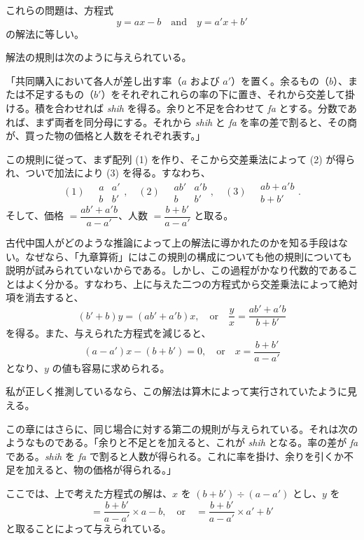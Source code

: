 \documentclass[11pt]{article}
\newcommand{\scanpage}[2]{\clearpage\setcounter{footnote}{0}\noindent{\footnotesize\color{gray}PDF #1 頁 · #2}\par\medskip}
\newcommand{\scanfooter}{}
\begin{document}
これらの問題は、方程式
\[
y=ax-b\quad \text{and}\quad y=a'x+b'
\]
の解法に等しい。

解法の規則は次のように与えられている。

「共同購入において各人が差し出す率（$a$ および $a'$）を置く。余るもの（$b$）、または不足するもの（$b'$）をそれぞれこれらの率の下に置き、それから交差して掛ける。積を合わせれば \emph{shih} を得る。余りと不足を合わせて \emph{fa} とする。分数であれば、まず両者を同分母にする。それから \emph{shih} と \emph{fa} を率の差で割ると、その商が、買った物の価格と人数をそれぞれ表す。」

この規則に従って、まず配列 (1) を作り、そこから交差乗法によって (2) が得られ、ついで加法により (3) を得る。すなわち、
\[
(1)\quad \begin{array}{cc}a&a'\\ b&b'\end{array},\quad
(2)\quad \begin{array}{cc}ab'&a'b\\ b&b'\end{array},\quad
(3)\quad \begin{array}{c}ab+a'b\\ b+b'\end{array}.
\]
そして、価格 $=\dfrac{ab'+a'b}{a-a'}$、人数 $=\dfrac{b+b'}{a-a'}$ と取る。
\scanfooter

\scanpage{0031}{第三章、印刷頁17}
古代中国人がどのような推論によって上の解法に導かれたのかを知る手段はない。なぜなら、「九章算術」にはこの規則の構成についても他の規則についても説明が試みられていないからである。しかし、この過程がかなり代数的であることはよく分かる。すなわち、上に与えた二つの方程式から交差乗法によって絶対項を消去すると、
\[
(b'+b)y=(ab'+a'b)x,\quad \text{or}\quad \frac yx=\frac{ab'+a'b}{b+b'}
\]
を得る。また、与えられた方程式を減じると、
\[
(a-a')x-(b+b')=0,\quad \text{or}\quad x=\frac{b+b'}{a-a'}
\]
となり、$y$ の値も容易に求められる。

私が正しく推測しているなら、この解法は算木によって実行されていたように見える。

この章にはさらに、同じ場合に対する第二の規則が与えられている。それは次のようなものである。「余りと不足とを加えると、これが \emph{shih} となる。率の差が \emph{fa} である。\emph{shih} を \emph{fa} で割ると人数が得られる。これに率を掛け、余りを引くか不足を加えると、物の価格が得られる。」

ここでは、上で考えた方程式の解は、$x$ を $(b+b')\div(a-a')$ とし、$y$ を
\[
=\frac{b+b'}{a-a'}\times a-b,\quad \text{or}\quad =\frac{b+b'}{a-a'}\times a'+b'
\]
と取ることによって与えられている。
\end{document}
